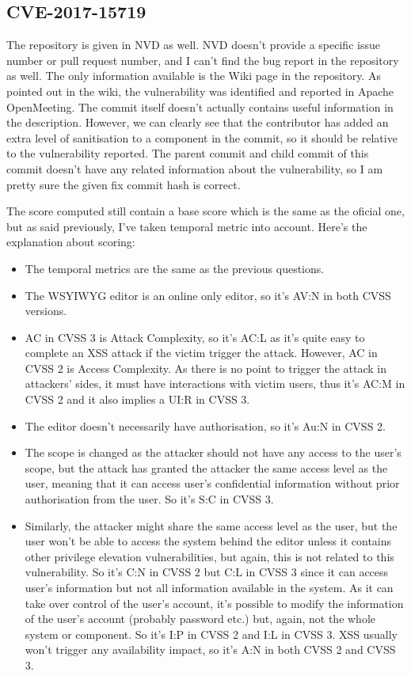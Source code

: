 \documentclass[12pt]{article}
\begin{document}
\subsection{CVE-2017-15719}

The repository is given in NVD as well. NVD doesn't provide a specific issue number or pull request number, and I can't find the bug report in the repository as well. The only information available is the Wiki page in the repository. As pointed out in the wiki, the vulnerability was identified and reported in Apache OpenMeeting. The commit itself doesn't actually contains useful information in the description. However, we can clearly see that the contributor has added an extra level of sanitisation to a component in the commit, so it should be relative to the vulnerability reported. The parent commit and child commit of this commit doesn't have any related information about the vulnerability, so I am pretty sure the given fix commit hash is correct.

The score computed still contain a base score which is the same as the oficial one, but as said previously, I've taken temporal metric into account. Here's the explanation about scoring:
\begin{itemize}
  \item The temporal metrics are the same as the previous questions.
  \item The WSYIWYG editor is an online only editor, so it's AV:N in both CVSS versions.
  \item AC in CVSS 3 is Attack Complexity, so it's AC:L as it's quite easy to complete an XSS attack if the victim trigger the attack. However, AC in CVSS 2 is Access Complexity. As there is no point to trigger the attack in attackers' sides, it must have interactions with victim users, thus it's AC:M in CVSS 2 and it also implies a UI:R in CVSS 3.
  \item The editor doesn't necessarily have authorisation, so it's Au:N in CVSS 2.
  \item The scope is changed as the attacker should not have any access to the user's scope, but the attack has granted the attacker the same access level as the user, meaning that it can access user's confidential information without prior authorisation from the user. So it's S:C in CVSS 3.
  \item Similarly, the attacker might share the same access level as the user, but the user won't be able to access the system behind the editor unless it contains other privilege elevation vulnerabilities, but again, this is not related to this vulnerability. So it's C:N in CVSS 2 but C:L in CVSS 3 since it can access user's information but not all information available in the system. As it can take over control of the user's account, it's possible to modify the information of the user's account (probably password etc.) but, again, not the whole system or component. So it's I:P in CVSS 2 and I:L in CVSS 3. XSS usually won't trigger any availability impact, so it's A:N in both CVSS 2 and CVSS 3.
\end{itemize}
\end{document}
